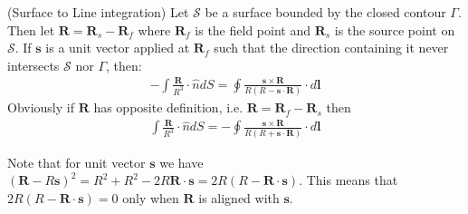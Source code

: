 \begin{mytheorem} (Surface to Line integration)
Let $\mathcal{S}$ be a surface bounded by the closed contour $\Gamma$. Then let $\bm R=\bm R_s-\bm R_f$ where $\bm R_f$ is the field point and $\bm R_s$ is the source point on $\mathcal{S}$. If $\bm s$ is a unit vector applied at $\bm R_f$ such that the direction containing it never intersects $\mathcal{S}$ nor $\Gamma$, then: 
\begin{align}
-\int\frac{\bm R}{R^3} \cdot\hat{n}dS=\oint\frac{\bm s\times\bm R}{R(R-\bm s\cdot\bm R)}\cdot d\bm l
\label{solidAngle2Line}
\end{align}
Obviously if $\bm R$ has opposite definition, i.e. $\bm R=\bm R_f-\bm R_s$ then
\begin{align}
\int\frac{\bm R}{R^3} \cdot\hat{n}dS=-\oint\frac{\bm s\times\bm R}{R(R+\bm s\cdot\bm R)}\cdot d\bm l
\label{solidAngle2Line2}
\end{align}

\end{mytheorem}



Note that for unit vector $\bm s$ we have $\left(\bm R-R\bm s\right)^2=R^2+R^2-2R\bm R\cdot\bm s=2R(R-\bm R\cdot\bm s)$. This means that $2R(R-\bm R\cdot\bm s)=0$ only when $\bm R$ is aligned with $\bm s$.

